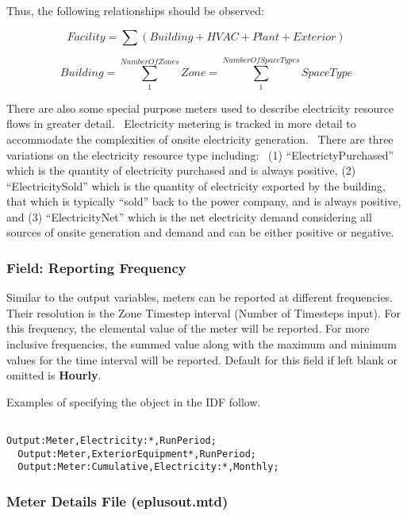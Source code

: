 Thus, the following relationships should be observed:

\begin{equation}
Facility = \sum {\left( {Building + HVAC + Plant + Exterior} \right)}
\end{equation}

\begin{equation}
Building = \sum\limits_1^{NumberOfZones} {Zone} = \sum\limits_1^{NumberOfSpaceTypes} {SpaceType}
\end{equation}

There are also some special purpose meters used to describe electricity resource flows in greater detail.~ Electricity metering is tracked in more detail to accommodate the complexities of onsite electricity generation.~ There are three variations on the electricity resource type including:~ (1) ``ElectrictyPurchased'' which is the quantity of electricity purchased and is always positive, (2) ``ElectricitySold'' which is the quantity of electricity exported by the building, that which is typically ``sold'' back to the power company, and is always positive, and (3) ``ElectricityNet'' which is the net electricity demand considering all sources of onsite generation and demand and can be either positive or negative.

\subsubsection{Field: Reporting Frequency}\label{field-reporting-frequency-1}

Similar to the output variables, meters can be reported at different frequencies. Their resolution is the Zone Timestep interval (Number of Timesteps input). For this frequency, the elemental value of the meter will be reported. For more inclusive frequencies, the summed value along with the maximum and minimum values for the time interval will be reported. Default for this field if left blank or omitted is \textbf{Hourly}.

Examples of specifying the object in the IDF follow.

\begin{lstlisting}

Output:Meter,Electricity:*,RunPeriod;
  Output:Meter,ExteriorEquipment*,RunPeriod;
  Output:Meter:Cumulative,Electricity:*,Monthly;
\end{lstlisting}

\subsubsection{Meter Details File (eplusout.mtd)}\label{meter-details-file-eplusout.mtd}

